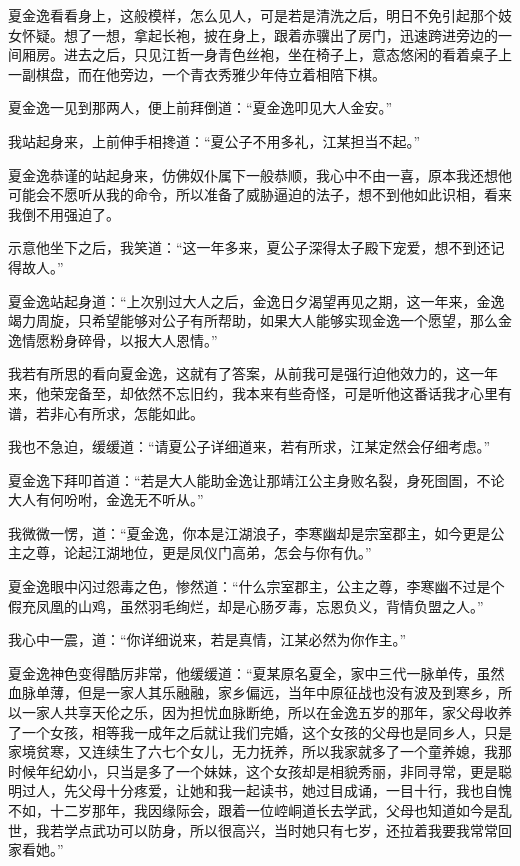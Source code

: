 夏金逸看看身上，这般模样，怎么见人，可是若是清洗之后，明日不免引起那个妓女怀疑。想了一想，拿起长袍，披在身上，跟着赤骥出了房门，迅速跨进旁边的一间厢房。进去之后，只见江哲一身青色丝袍，坐在椅子上，意态悠闲的看着桌子上一副棋盘，而在他旁边，一个青衣秀雅少年侍立着相陪下棋。

夏金逸一见到那两人，便上前拜倒道：“夏金逸叩见大人金安。”

我站起身来，上前伸手相搀道：“夏公子不用多礼，江某担当不起。”

夏金逸恭谨的站起身来，仿佛奴仆属下一般恭顺，我心中不由一喜，原本我还想他可能会不愿听从我的命令，所以准备了威胁逼迫的法子，想不到他如此识相，看来我倒不用强迫了。

示意他坐下之后，我笑道：“这一年多来，夏公子深得太子殿下宠爱，想不到还记得故人。”

夏金逸站起身道：“上次别过大人之后，金逸日夕渴望再见之期，这一年来，金逸竭力周旋，只希望能够对公子有所帮助，如果大人能够实现金逸一个愿望，那么金逸情愿粉身碎骨，以报大人恩情。”

我若有所思的看向夏金逸，这就有了答案，从前我可是强行迫他效力的，这一年来，他荣宠备至，却依然不忘旧约，我本来有些奇怪，可是听他这番话我才心里有谱，若非心有所求，怎能如此。

我也不急迫，缓缓道：“请夏公子详细道来，若有所求，江某定然会仔细考虑。”

夏金逸下拜叩首道：“若是大人能助金逸让那靖江公主身败名裂，身死囹圄，不论大人有何吩咐，金逸无不听从。”

我微微一愣，道：“夏金逸，你本是江湖浪子，李寒幽却是宗室郡主，如今更是公主之尊，论起江湖地位，更是凤仪门高弟，怎会与你有仇。”

夏金逸眼中闪过怨毒之色，惨然道：“什么宗室郡主，公主之尊，李寒幽不过是个假充凤凰的山鸡，虽然羽毛绚烂，却是心肠歹毒，忘恩负义，背情负盟之人。”

我心中一震，道：“你详细说来，若是真情，江某必然为你作主。”

夏金逸神色变得酷厉非常，他缓缓道：“夏某原名夏全，家中三代一脉单传，虽然血脉单薄，但是一家人其乐融融，家乡偏远，当年中原征战也没有波及到寒乡，所以一家人共享天伦之乐，因为担忧血脉断绝，所以在金逸五岁的那年，家父母收养了一个女孩，相等我一成年之后就让我们完婚，这个女孩的父母也是同乡人，只是家境贫寒，又连续生了六七个女儿，无力抚养，所以我家就多了一个童养媳，我那时候年纪幼小，只当是多了一个妹妹，这个女孩却是相貌秀丽，非同寻常，更是聪明过人，先父母十分疼爱，让她和我一起读书，她过目成诵，一目十行，我也自愧不如，十二岁那年，我因缘际会，跟着一位崆峒道长去学武，父母也知道如今是乱世，我若学点武功可以防身，所以很高兴，当时她只有七岁，还拉着我要我常常回家看她。”

